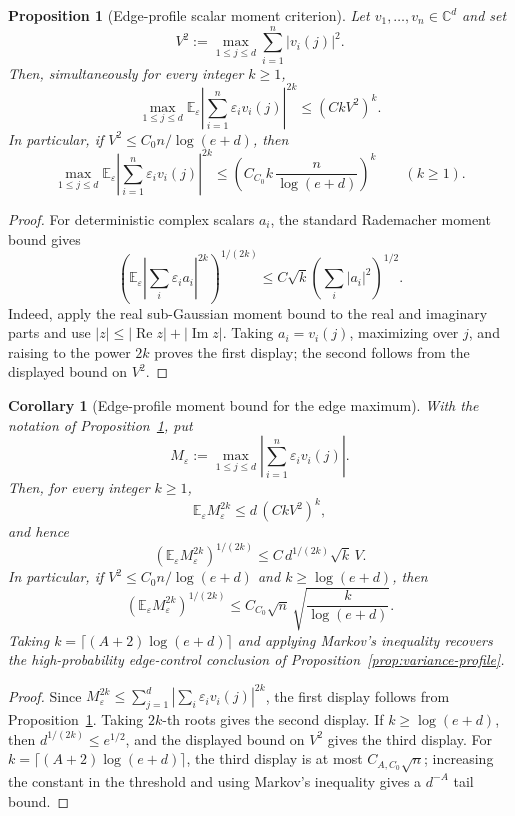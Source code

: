 \documentclass[11pt]{amsart}
\numberwithin{equation}{section}
\newtheorem{proposition}[theorem]{Proposition}
\newtheorem{corollary}[theorem]{Corollary}
\theoremstyle{definition}
\theoremstyle{remark}
\newcommand{\C}{\mathbb C}
\newcommand{\Exp}{\mathbb E}
\newcommand{\abs}[1]{\left\lvert #1\right\rvert}
\newcommand{\eps}{\varepsilon}
\begin{document}
\begin{proposition}[Edge-profile scalar moment criterion]
\label{prop:edge-moment-profile}
Let \(v_1,\ldots,v_n\in\C^d\) and set
\[
  V^2:=\max_{1\le j\le d}\sum_{i=1}^n\abs{v_i(j)}^2 .
\]
Then, simultaneously for every integer \(k\ge1\),
\[
  \max_{1\le j\le d}
  \Exp_\eps\left|\sum_{i=1}^n\eps_i v_i(j)\right|^{2k}
  \le (CkV^2)^k .
\]
In particular, if \(V^2\le C_0n/\log(e+d)\), then
\[
  \max_{1\le j\le d}
  \Exp_\eps\left|\sum_{i=1}^n\eps_i v_i(j)\right|^{2k}
  \le
  \left(C_{C_0}k\,\frac n{\log(e+d)}\right)^k
  \qquad(k\ge1).
\]
\end{proposition}

\begin{proof}
For deterministic complex scalars \(a_i\), the standard Rademacher moment bound
gives
\[
  \left(\Exp_\eps\left|\sum_i\eps_i a_i\right|^{2k}\right)^{1/(2k)}
  \le C\sqrt{k}\left(\sum_i|a_i|^2\right)^{1/2}.
\]
Indeed, apply the real sub-Gaussian moment bound to the real and imaginary
parts and use
\(|z|\le|\operatorname{Re}z|+|\operatorname{Im}z|\).  Taking
\(a_i=v_i(j)\), maximizing over \(j\), and raising to the power \(2k\) proves
the first display; the second follows from the displayed bound on \(V^2\).
\end{proof}

\begin{corollary}[Edge-profile moment bound for the edge maximum]
\label{cor:edge-max-moment-profile}
With the notation of Proposition~\ref{prop:edge-moment-profile}, put
\[
  M_\eps:=\max_{1\le j\le d}\left|\sum_{i=1}^n\eps_i v_i(j)\right|.
\]
Then, for every integer \(k\ge1\),
\[
  \Exp_\eps M_\eps^{2k}\le d\,(CkV^2)^k,
\]
and hence
\[
  \left(\Exp_\eps M_\eps^{2k}\right)^{1/(2k)}
  \le C\,d^{1/(2k)}\sqrt{k}\,V .
\]
In particular, if \(V^2\le C_0n/\log(e+d)\) and
\(k\ge\log(e+d)\), then
\[
  \left(\Exp_\eps M_\eps^{2k}\right)^{1/(2k)}
  \le C_{C_0}\sqrt n\,\sqrt{\frac{k}{\log(e+d)}} .
\]
Taking \(k=\lceil(A+2)\log(e+d)\rceil\) and applying Markov's inequality
recovers the high-probability edge-control conclusion of
Proposition~\ref{prop:variance-profile}.
\end{corollary}

\begin{proof}
Since \(M_\eps^{2k}\le\sum_{j=1}^d|\sum_i\eps_i v_i(j)|^{2k}\), the first
display follows from Proposition~\ref{prop:edge-moment-profile}.  Taking
\(2k\)-th roots gives the second display.  If \(k\ge\log(e+d)\), then
\(d^{1/(2k)}\le e^{1/2}\), and the displayed bound on \(V^2\) gives the third
display.  For \(k=\lceil(A+2)\log(e+d)\rceil\), the third display is at most
\(C_{A,C_0}\sqrt n\); increasing the constant in the threshold and using
Markov's inequality gives a \(d^{-A}\) tail bound.
\end{proof}
\end{document}
